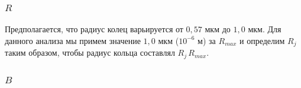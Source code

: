 \documentclass[A4,12pt,oneside]{article}
\renewcommand{\(}{\left(}
\renewcommand{\)}{\right)}
\begin{document}
\subsubsection{$R$}

Предполагается, что радиус колец варьируется от $0,57$ мкм до $1,0$ мкм. Для данного анализа мы примем значение $1,0$ мкм ($10^{-6}$ м) за $R_{max}$ и определим $R_j$ таким образом, чтобы радиус кольца составлял $R_j \, R_{max}$.

\subsubsection{$B$}
\end{document}
